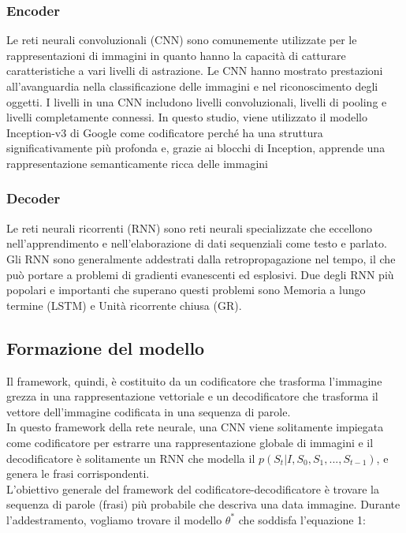 \documentclass[12pt,a4paper]{report}
\begin{document}
\subsubsection{Encoder}
Le reti neurali convoluzionali (CNN) sono comunemente utilizzate per le rappresentazioni di immagini in quanto hanno la capacità di catturare caratteristiche a vari livelli di astrazione. Le CNN hanno mostrato prestazioni all'avanguardia nella classificazione delle immagini e nel riconoscimento degli oggetti. I livelli in una CNN includono livelli convoluzionali, livelli di pooling e livelli completamente connessi. 
In questo studio, viene utilizzato il modello Inception-v3 di Google come codificatore perché ha una struttura significativamente più profonda e, grazie ai blocchi di Inception, apprende una rappresentazione semanticamente ricca delle immagini

\subsubsection{Decoder}
Le reti neurali ricorrenti (RNN) sono reti neurali specializzate che eccellono nell'apprendimento e nell'elaborazione di dati sequenziali come testo e parlato. Gli RNN sono generalmente addestrati dalla retropropagazione nel tempo, il che può portare a problemi di gradienti evanescenti ed esplosivi. Due degli RNN più popolari e importanti che superano questi problemi sono Memoria a lungo termine (LSTM) e Unità ricorrente chiusa (GR).

\subsection{Formazione del modello}
Il framework, quindi, è costituito da un codificatore che trasforma l'immagine grezza in una rappresentazione vettoriale e un decodificatore che trasforma il vettore dell'immagine codificata in una sequenza di parole.\\
In questo framework della rete neurale, una CNN viene solitamente impiegata come codificatore per estrarre una rappresentazione globale di immagini e il decodificatore è solitamente un RNN che modella il $p(S_t|I, S_0, S_1, . . . ,S_{t-1})$, e genera le frasi corrispondenti.\\
L'obiettivo generale del framework del codificatore-decodificatore è trovare la sequenza di parole (frasi) più probabile che descriva una data immagine. Durante l'addestramento, vogliamo trovare il modello $\theta^*$ che soddisfa l’equazione 1:
\end{document}
